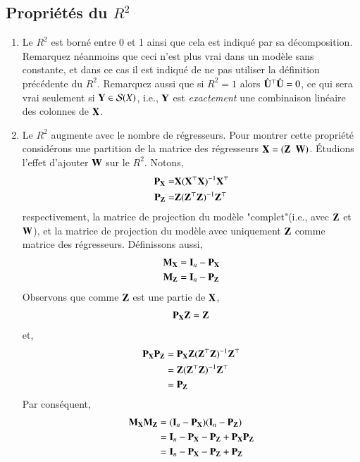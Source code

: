 \documentclass[10pt, reqno]{amsart}
\begin{document}
\subsection{Propriétés du $R^2$}
\begin{enumerate}
\item Le $R^2$ est borné entre 0 et 1 ainsi que cela est indiqué par sa décomposition. Remarquez néanmoins que ceci n'est plus vrai dans un modèle sans constante, et dans ce cas il est indiqué de ne pas utiliser la définition précédente du $R^2$. Remarquez aussi que si $R^2 =  1$ alors $\hat{\mathbf U}^\top\hat{\mathbf U} = 0$, ce qui sera vrai seulement si $\mathbf Y\in \mathcal{S}(X)$, i.e., $\mathbf Y$ est \emph{exactement} une combinaison linéaire des colonnes de $\mathbf X$.
\item Le $R^2$ augmente avec le nombre de régresseurs. Pour montrer cette propriété considérons une partition de la matrice des régresseurs $\mathbf X = (\mathbf Z \ \ \mathbf W)$. \'Etudions l'effet d'ajouter $\mathbf W$ sur le $R^2$. Notons,
\begin{align*}
\mathbf P_\mathbf X = &\mathbf X(\mathbf X^\top\mathbf X)^{-1}\mathbf X^\top\\
\mathbf P_\mathbf Z = &\mathbf Z(\mathbf Z^\top\mathbf Z)^{-1}\mathbf Z^\top
\end{align*}
respectivement, la matrice de projection du modèle "complet"(i.e., avec $\mathbf Z$ et $\mathbf W$), et la matrice de projection du modèle avec uniquement $\mathbf Z$ comme matrice des régresseurs. Définissons aussi,
\begin{align*}
\mathbf M_\mathbf X  &= \mathbf{I}_n - \mathbf P_\mathbf X\\
\mathbf M_\mathbf Z &= \mathbf{I}_n - \mathbf P_\mathbf Z
\end{align*}
Observons que comme $\mathbf Z$ est une partie de $\mathbf X$,
\begin{align*}
\mathbf P_\mathbf X  \mathbf Z = \mathbf Z
\end{align*}
et,
\begin{align*}
\mathbf P_\mathbf X\mathbf P_\mathbf Z &= \mathbf P_\mathbf X \mathbf Z(\mathbf Z^\top\mathbf Z)^{-1}\mathbf Z^\top\\
& = \mathbf Z(\mathbf Z^\top\mathbf Z)^{-1}\mathbf Z^\top \\
&= \mathbf P_\mathbf Z
\end{align*}
Par conséquent,
\begin{align*}
\boldM_\boldX\boldM_\boldZ& = (\Id_n - \boldP_\boldX)(\Id_n - \boldP_\boldZ)\\
&=\Id_n - \boldP_\boldX - \boldP_\boldZ + \boldP_\boldX\boldP_\boldZ\\
&=\Id_n - \boldP_\boldX - \boldP_\boldZ +  \boldP_\boldZ\\

\end{align*}
\end{enumerate}
\end{document}
